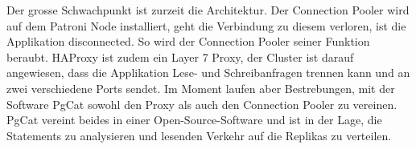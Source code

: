 \begin{flushleft}
    Der grosse Schwachpunkt ist zurzeit die Architektur.
    Der \Gls{Connection Pooler} wird auf dem Patroni Node installiert, geht die Verbindung zu diesem verloren, ist die Applikation disconnected.
    So wird der \Gls{Connection Pooler} seiner Funktion beraubt.
    \Gls{HAProxy} ist zudem ein Layer 7 Proxy, der Cluster ist darauf angewiesen, dass die Applikation Lese- und Schreibanfragen trennen kann und an zwei verschiedene Ports sendet.
    Im Moment laufen aber Bestrebungen, mit der Software PgCat sowohl den Proxy als auch den \Gls{Connection Pooler} zu vereinen.
    PgCat vereint beides in einer Open-Source-Software und ist in der Lage, die Statements zu analysieren und lesenden Verkehr auf die Replikas zu verteilen.
\end{flushleft}